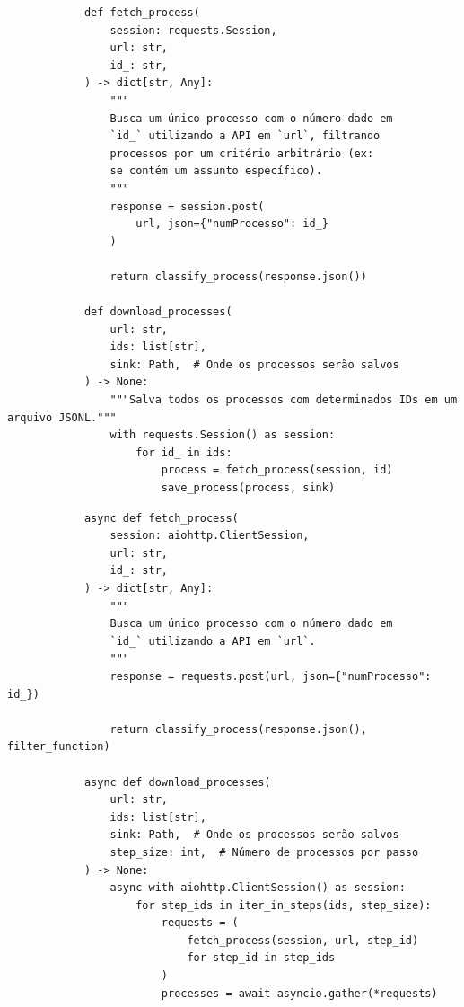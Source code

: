 \begin{listing}[htb]
    \tiny
    \begin{minipage}[t]{0.5\textwidth}
        \begin{verbatim}
            def fetch_process(
                session: requests.Session,
                url: str,
                id_: str,
            ) -> dict[str, Any]:
                """
                Busca um único processo com o número dado em
                `id_` utilizando a API em `url`, filtrando
                processos por um critério arbitrário (ex:
                se contém um assunto específico).
                """
                response = session.post(
                    url, json={"numProcesso": id_}
                )

                return classify_process(response.json())

            def download_processes(
                url: str,
                ids: list[str],
                sink: Path,  # Onde os processos serão salvos
            ) -> None:
                """Salva todos os processos com determinados IDs em um arquivo JSONL."""
                with requests.Session() as session:
                    for id_ in ids:
                        process = fetch_process(session, id)
                        save_process(process, sink)
        \end{verbatim}
    \end{minipage}
    \begin{minipage}[t]{0.6\textwidth}
        \begin{verbatim}
            async def fetch_process(
                session: aiohttp.ClientSession,
                url: str,
                id_: str,
            ) -> dict[str, Any]:
                """
                Busca um único processo com o número dado em
                `id_` utilizando a API em `url`.
                """
                response = requests.post(url, json={"numProcesso": id_})

                return classify_process(response.json(), filter_function)

            async def download_processes(
                url: str,
                ids: list[str],
                sink: Path,  # Onde os processos serão salvos
                step_size: int,  # Número de processos por passo
            ) -> None:
                async with aiohttp.ClientSession() as session:
                    for step_ids in iter_in_steps(ids, step_size):
                        requests = (
                            fetch_process(session, url, step_id)
                            for step_id in step_ids
                        )
                        processes = await asyncio.gather(*requests)


\end{verbatim}
\end{minipage}
\end{listing}
